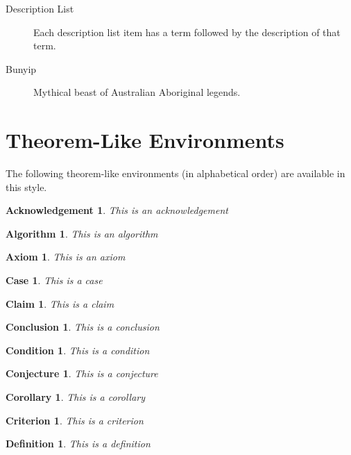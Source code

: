 \documentclass[a4paper]{book}%
\newtheorem{acknowledgement}[theorem]{Acknowledgement}
\newtheorem{algorithm}[theorem]{Algorithm}
\newtheorem{axiom}[theorem]{Axiom}
\newtheorem{case}[theorem]{Case}
\newtheorem{claim}[theorem]{Claim}
\newtheorem{conclusion}[theorem]{Conclusion}
\newtheorem{condition}[theorem]{Condition}
\newtheorem{conjecture}[theorem]{Conjecture}
\newtheorem{corollary}[theorem]{Corollary}
\newtheorem{criterion}[theorem]{Criterion}
\newtheorem{definition}[theorem]{Definition}
\begin{document}
\begin{description}
\item[Description List] Each description list item has a term followed by the
description of that term.

\item[Bunyip] Mythical beast of Australian Aboriginal legends.
\end{description}

\section{Theorem-Like Environments}

The following theorem-like environments (in alphabetical order) are available
in this style.

\begin{acknowledgement}
This is an acknowledgement
\end{acknowledgement}

\begin{algorithm}
This is an algorithm
\end{algorithm}

\begin{axiom}
This is an axiom
\end{axiom}

\begin{case}
This is a case
\end{case}

\begin{claim}
This is a claim
\end{claim}

\begin{conclusion}
This is a conclusion
\end{conclusion}

\begin{condition}
This is a condition
\end{condition}

\begin{conjecture}
This is a conjecture
\end{conjecture}

\begin{corollary}
This is a corollary
\end{corollary}

\begin{criterion}
This is a criterion
\end{criterion}

\begin{definition}
This is a definition
\end{definition}
\end{document}
